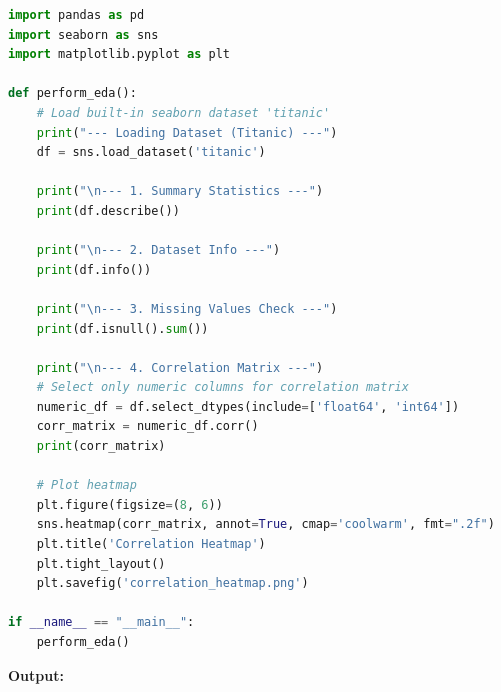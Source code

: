 \documentclass[a4paper,12pt]{article}
\begin{document}
\begin{lstlisting}[language=Python, caption={EDA implementation using Pandas and Seaborn}]
import pandas as pd
import seaborn as sns
import matplotlib.pyplot as plt

def perform_eda():
    # Load built-in seaborn dataset 'titanic'
    print("--- Loading Dataset (Titanic) ---")
    df = sns.load_dataset('titanic')

    print("\n--- 1. Summary Statistics ---")
    print(df.describe())

    print("\n--- 2. Dataset Info ---")
    print(df.info())

    print("\n--- 3. Missing Values Check ---")
    print(df.isnull().sum())

    print("\n--- 4. Correlation Matrix ---")
    # Select only numeric columns for correlation matrix
    numeric_df = df.select_dtypes(include=['float64', 'int64'])
    corr_matrix = numeric_df.corr()
    print(corr_matrix)

    # Plot heatmap
    plt.figure(figsize=(8, 6))
    sns.heatmap(corr_matrix, annot=True, cmap='coolwarm', fmt=".2f")
    plt.title('Correlation Heatmap')
    plt.tight_layout()
    plt.savefig('correlation_heatmap.png')

if __name__ == "__main__":
    perform_eda()
\end{lstlisting}
\vspace{0.5cm}
\textbf{Output:}
\end{document}
